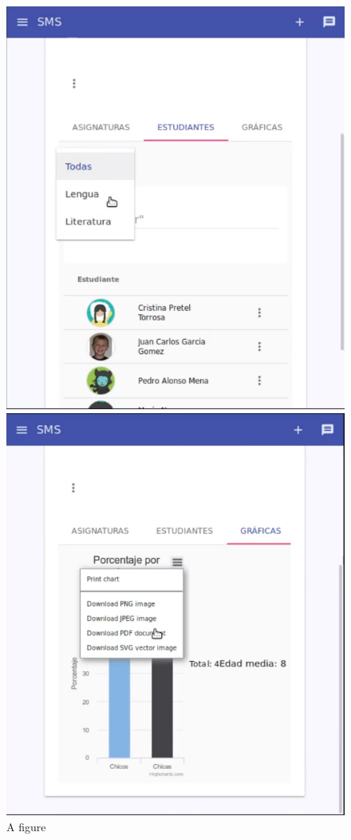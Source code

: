 \begin{figure}[H]
\centering
\begin{minipage}{.5\textwidth}
  \centering
  \includegraphics[scale=0.3]{img/snaps/teacher_profile_students.png}
  \caption{A figure}
\end{minipage}%
\begin{minipage}{.5\textwidth}
  \centering
  \includegraphics[scale=0.3]{img/snaps/teacher_profile_graphics.png}

\end{minipage}
\end{figure}
